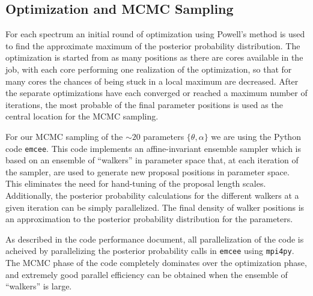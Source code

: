 \documentclass[11pt,preprint]{aastex}
\begin{document}
\subsection{Optimization and MCMC Sampling}
For each spectrum an initial round of optimization using Powell's method is used to find the approximate maximum of the posterior probability distribution. 
The optimization is started from as many positions as there are cores available in the job, with each core performing one realization of the optimization, so that for many cores the chances of being stuck in a local maximum are decreased.
After the separate optimizations have each converged or reached a maximum number of iterations, the most probable of the final parameter positions is used as the central location for the MCMC sampling.  

For our MCMC sampling of the $\sim 20$ parameters $\{\theta, \alpha\}$ we are using the Python code \texttt{emcee}.  
This code implements an affine-invariant ensemble sampler \citep{goodman_weare} which is based on an ensemble of ``walkers'' in parameter space that, at each iteration of the sampler, are used to generate new proposal positions in parameter space.  
This eliminates the need for hand-tuning of the proposal length scales.  
Additionally, the posterior probability calculations for the different walkers at a given iteration can be simply parallelized.  The final density of walker positions is an approximation to the posterior probability distribution for the parameters.

As described in the code performance document, all parallelization of the code is acheived by parallelizing the posterior probability calls in \texttt{emcee} using \texttt{mpi4py}.  
The MCMC phase of the code completely dominates over the optimization phase, and extremely good parallel efficiency can be obtained when the ensemble of ``walkers'' is large.




\end{document}
